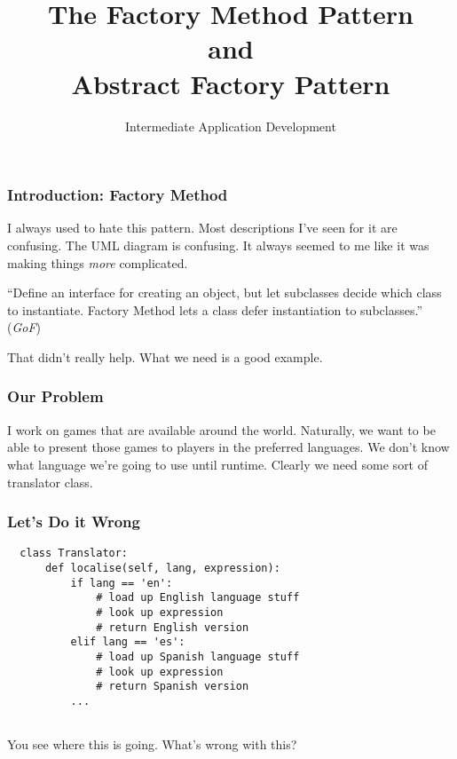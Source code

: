 \documentclass[10pt]{beamer}
\title{The Factory Method Pattern \\ and \\ Abstract Factory Pattern}
\author[IN608]{Intermediate Application Development}
\institute[Otago Polytechnic]{
  Otago Polytechnic \\
  Dunedin, New Zealand \\
  Kaiako: Tom Clark
}
\date{}
\begin{document}
\begin{frame}[plain]
  \titlepage
\end{frame}

\begin{frame}[fragile]
  \frametitle{Introduction: Factory Method}
  
  I always used to hate this pattern. Most descriptions I've seen for it are
  confusing. The UML diagram is confusing. It always seemed to me like it was 
  making things \emph{more} complicated.
  
  \vspace{5mm}
  ``Define an interface for creating an object, but let subclasses decide which class
  to instantiate. Factory Method lets a class defer instantiation to subclasses.'' \\
  (\emph{GoF})
  
  That didn't really help. What we need is a good example.

  
  \end{frame}
\begin{frame}
  \frametitle{Our Problem}
  
  I work on games that are available around the world. Naturally, we
  want to be able to present those games to players in the preferred 
  languages. We don't know what language we're going to use until 
  runtime. Clearly we need some sort of translator class.  
  \end{frame}
  

\begin{frame}[fragile]
  \frametitle{Let's Do it Wrong}

  \begin{verbatim}
  class Translator:
      def localise(self, lang, expression):
          if lang == 'en':
              # load up English language stuff
              # look up expression
              # return English version
          elif lang == 'es':
              # load up Spanish language stuff
              # look up expression
              # return Spanish version
          ...
       
  \end{verbatim}
  You see where this is going. What's wrong with this?
 \end{frame} 
\end{document}
